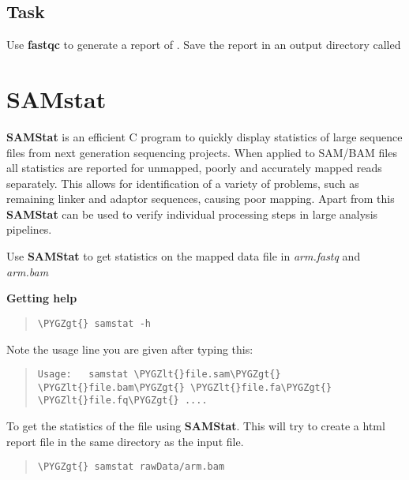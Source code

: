 \documentclass[a4paper,11pt,english]{sphinxmanual}
\def\PYGZlt{\char`\<}
\def\PYGZgt{\char`\>}
\begin{document}
\subsection{Task}
\label{exercises/STEP1_QualityControl:task}
Use \textbf{fastqc} to generate a report of . Save the report in an output directory called 


\section{SAMstat}
\label{exercises/STEP1_QualityControl:samstat}
\textbf{SAMStat} is an efficient C program to quickly display statistics of large sequence files from next generation sequencing projects. When applied to SAM/BAM files all statistics are reported for unmapped, poorly and accurately mapped reads separately. This allows for identification of a variety of problems, such as remaining linker and adaptor sequences, causing poor mapping. Apart from this \textbf{SAMStat} can be used to verify individual processing steps in large analysis pipelines.

Use \textbf{SAMStat} to get statistics on the mapped data file in \emph{arm.fastq} and \emph{arm.bam}

\textbf{Getting help}
\begin{quote}

\begin{Verbatim}[frame=single, rulecolor=\color{lightgray}, fontfamily=courier, commandchars=\\\{\}]
\PYGZgt{} samstat -h
\end{Verbatim}
\end{quote}

Note the usage line you are given after typing this:
\begin{quote}

\begin{Verbatim}[frame=single, rulecolor=\color{lightgray}, fontfamily=courier, commandchars=\\\{\}]
Usage:   samstat \PYGZlt{}file.sam\PYGZgt{} \PYGZlt{}file.bam\PYGZgt{} \PYGZlt{}file.fa\PYGZgt{} \PYGZlt{}file.fq\PYGZgt{} ....
\end{Verbatim}
\end{quote}

To get the statistics of the  file using \textbf{SAMStat}. This will try to create a html report file in the same directory as the input file.
\begin{quote}

\begin{Verbatim}[frame=single, rulecolor=\color{lightgray}, fontfamily=courier, commandchars=\\\{\}]
\PYGZgt{} samstat rawData/arm.bam
\end{Verbatim}
\end{quote}
\end{document}
